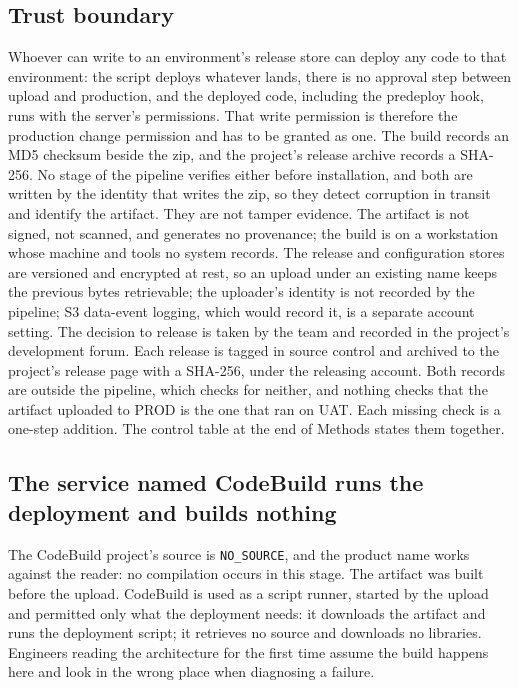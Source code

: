 \documentclass[11pt]{article}
\begin{document}
\subsection{Trust boundary}

Whoever can write to an environment's release store can deploy any code to that environment: the script deploys whatever lands, there is no approval step between upload and production, and the deployed code, including the predeploy hook, runs with the server's permissions. That write permission is therefore the production change permission and has to be granted as one. The build records an MD5 checksum beside the zip, and the project's release archive records a SHA-256. No stage of the pipeline verifies either before installation, and both are written by the identity that writes the zip, so they detect corruption in transit and identify the artifact. They are not tamper evidence. The artifact is not signed, not scanned, and generates no provenance; the build is on a workstation whose machine and tools no system records. The release and configuration stores are versioned and encrypted at rest, so an upload under an existing name keeps the previous bytes retrievable; the uploader's identity is not recorded by the pipeline; S3 data-event logging, which would record it, is a separate account setting. The decision to release is taken by the team and recorded in the project's development forum. Each release is tagged in source control and archived to the project's release page with a SHA-256, under the releasing account. Both records are outside the pipeline, which checks for neither, and nothing checks that the artifact uploaded to PROD is the one that ran on UAT. Each missing check is a one-step addition. The control table at the end of Methods states them together.

\subsection{The service named CodeBuild runs the deployment and builds nothing}

The CodeBuild project's source is \texttt{NO\_SOURCE}, and the product name works against the reader: no compilation occurs in this stage. The artifact was built before the upload. CodeBuild is used as a script runner, started by the upload and permitted only what the deployment needs: it downloads the artifact and runs the deployment script; it retrieves no source and downloads no libraries. Engineers reading the architecture for the first time assume the build happens here and look in the wrong place when diagnosing a failure.
\end{document}
